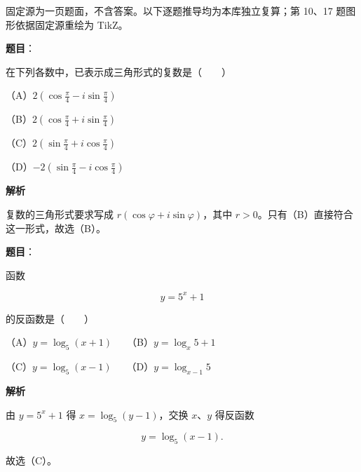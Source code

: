 

\begin{gktip}
固定源为一页题面，不含答案。以下逐题推导均为本库独立复算；第 10、17 题图形依据固定源重绘为 TikZ。
\end{gktip}

\begin{answer}

\textbf{题目}：

在下列各数中，已表示成三角形式的复数是\mbox{（　　）}

（A）$2\left(\cos\frac\pi4-i\sin\frac\pi4\right)$

（B）$2\left(\cos\frac\pi4+i\sin\frac\pi4\right)$

（C）$2\left(\sin\frac\pi4+i\cos\frac\pi4\right)$

（D）$-2\left(\sin\frac\pi4-i\cos\frac\pi4\right)$

\textbf{解析}

复数的三角形式要求写成 $r(\cos\varphi+i\sin\varphi)$，其中 $r>0$。只有（B）直接符合这一形式，故选（B）。


\end{answer}
\begin{answer}

\textbf{题目}：

函数

\nopagebreak[4]
\[
y=5^x+1
\]

的反函数是\mbox{（　　）}

（A）$y=\log_5(x+1)$　　（B）$y=\log_x5+1$

（C）$y=\log_5(x-1)$　　（D）$y=\log_{x-1}5$

\textbf{解析}

由 $y=5^x+1$ 得 $x=\log_5(y-1)$，交换 $x\text{、}y$ 得反函数

\nopagebreak[4]
\[
y=\log_5(x-1).
\]

故选（C）。


\end{answer}
